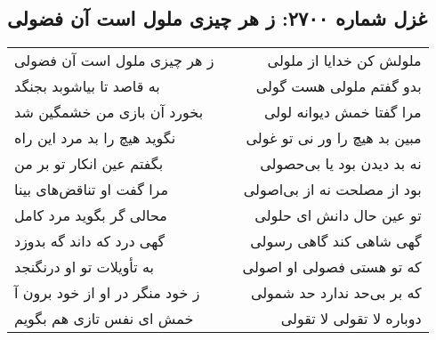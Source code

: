 \begin{center}
\section*{غزل شماره ۲۷۰۰: ز هر چیزی ملول است آن فضولی}
\label{sec:2700}
\begin{longtable}{l p{0.5cm} r}
ز هر چیزی ملول است آن فضولی
&&
ملولش کن خدایا از ملولی
\\
به قاصد تا بیاشوبد بجنگد
&&
بدو گفتم ملولی هست گولی
\\
بخورد آن بازی من خشمگین شد
&&
مرا گفتا خمش دیوانه لولی
\\
نگوید هیچ را بد مرد این راه
&&
مبین بد هیچ را ور نی تو غولی
\\
بگفتم عین انکار تو بر من
&&
نه بد دیدن بود یا بی‌حصولی
\\
مرا گفت او تناقض‌های بینا
&&
بود از مصلحت نه از بی‌اصولی
\\
محالی گر بگوید مرد کامل
&&
تو عین حال دانش ای حلولی
\\
گهی درد که داند گه بدوزد
&&
گهی شاهی کند گاهی رسولی
\\
به تأویلات تو او درنگنجد
&&
که تو هستی فصولی او اصولی
\\
ز خود منگر در او از خود برون آ
&&
که بر بی‌حد ندارد حد شمولی
\\
خمش ای نفس تازی هم بگویم
&&
دوباره لا تقولی لا تقولی
\\
\end{longtable}
\end{center}
